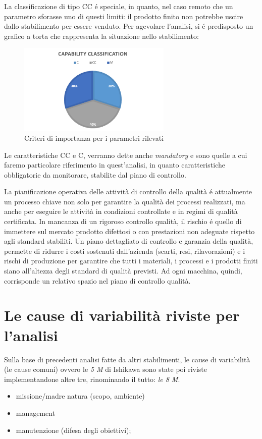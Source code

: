 La classificazione di tipo CC é speciale, in quanto, 
nel caso remoto che un parametro sforasse uno di questi limiti: il prodotto finito non potrebbe uscire dallo stabilimento per essere venduto.
Per agevolare l'analisi, si é predisposto un grafico a torta che rappresenta la situazione nello stabilimento:

\begin{figure}[h]
  \centering
  \includegraphics[width=0.65\textwidth]{img/cp-classification.png}
  \caption{Criteri di importanza per i parametri rilevati}
  \label{fig:cp-classification.jpg}
\end{figure}

Le caratteristiche CC e C, verranno dette anche \textit{mandatory} e sono quelle a cui faremo particolare riferimento in quest'analisi, in quanto caratteristiche obbligatorie da monitorare, stabilite dal piano di controllo.

La pianificazione operativa delle attività di controllo della qualità é attualmente un processo chiave non solo per garantire la qualità dei processi realizzati, ma anche per eseguire le attività in condizioni controllate e in regimi di qualità certificata.
In mancanza di un rigoroso controllo qualità, il rischio é quello di immettere sul mercato prodotto difettosi o con prestazioni non adeguate rispetto agli standard stabiliti.
Un piano dettagliato di controllo e garanzia della qualità, permette di ridurre i costi sostenuti dall'azienda (scarti, resi, rilavorazioni) e i rischi di produzione per garantire che tutti i materiali, i processi e i prodotti finiti siano all'altezza degli standard di qualità previsti.
Ad ogni macchina, quindi, corrisponde un relativo spazio nel piano di controllo qualità.

\section{Le cause di variabilità riviste per l'analisi}
Sulla base di precedenti analisi fatte da altri stabilimenti, le cause di variabilità (le cause comuni) ovvero le \textit{5 M} di Ishikawa sono state poi riviste implementandone altre tre, rinominando il tutto: \textit{le 8 M}.  
\begin{itemize}
  \item missione/madre natura (scopo, ambiente)
  \item management 
  \item manutenzione (difesa degli obiettivi);
  \end{itemize}



